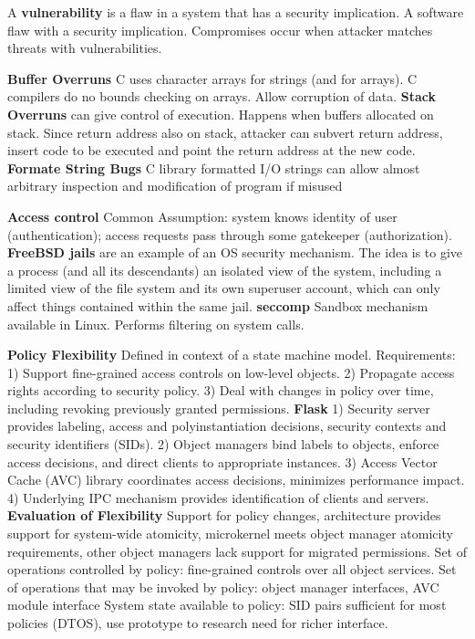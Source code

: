 \documentclass[6pt,landscape]{article}
\begin{document}
\begin{multicols}{3}
A {\bf vulnerability} is a flaw in a system that has a security implication. A software flaw with a security implication. Compromises occur when attacker matches threats with vulnerabilities.

{\bf Buffer Overruns} C uses character arrays for strings (and for arrays). C compilers do no bounds checking on arrays. Allow corruption of data.
{\bf Stack Overruns} can give control of execution. Happens when buffers allocated on stack. Since return address also on stack, attacker can subvert return address, insert code to be executed and point the return address at the new code.
{\bf Formate String Bugs} C library formatted I/O strings can allow almost arbitrary inspection and modification of program if misused

{\bf Access control}  Common Assumption: system knows identity of user (authentication); access requests pass through some gatekeeper (authorization).
{\bf FreeBSD jails} are an example of an OS security mechanism. The idea is to give a process (and all its descendants) an isolated view of the system, including a limited view of the file system and its own superuser account, which can only affect things contained within the same jail.
{\bf seccomp} Sandbox mechanism available in Linux. Performs filtering on system calls.

{\bf Policy Flexibility} Defined in context of a state machine model. Requirements: 
1) Support fine-grained access controls on low-level objects.
2) Propagate access rights according to security policy.
3) Deal with changes in policy over time, including revoking previously granted permissions.
{\bf Flask} 1) Security server provides labeling, access and polyinstantiation decisions, security contexts and security identifiers (SIDs).
2) Object managers bind labels to objects, enforce access decisions, and direct clients to appropriate instances.
3) Access Vector Cache (AVC) library coordinates access decisions, minimizes performance impact.
4) Underlying IPC mechanism provides identification of clients and servers.
{\bf Evaluation of Flexibility} Support for policy changes, architecture provides support for system-wide atomicity, microkernel meets object manager atomicity requirements, other object managers lack support for migrated permissions.
Set of operations controlled by policy: fine-grained controls over all object services.
Set of operations that may be invoked by policy: object manager interfaces, AVC module interface
System state available to policy: SID pairs sufficient for most policies (DTOS), use prototype to research need for richer interface.


\end{multicols}
\end{document}
